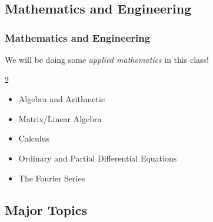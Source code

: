 \documentclass[fleqn]{ltx-talk} %
\newcommand{\sectionIsubsectionIIItitle}{Mathematics and Engineering}
\newcommand{\sectionIsubsectionIVtitle}{Major Topics}
\begin{document}
	\subsection{\sectionIsubsectionIIItitle}\label{sectionIsubsectionIII}
		\begin{frame} 
			\frametitle{\sectionIsubsectionIIItitle}

			We will be doing some {\itshape applied mathematics} in this class!
			\begin{multicols}{2}
			\begin{itemize}
				\item Algebra and Arithmetic\\
				\item Matrix\slash Linear Algebra\\
				\item Calculus\\
				\item Ordinary and Partial Differential Equations \\
				\item The Fourier Series\\
			\end{itemize}
			\end{multicols} 

			\btVFill
		\end{frame}	

	\subsection{\sectionIsubsectionIVtitle}\label{sectionIsubsectionIV}	
\end{document}

